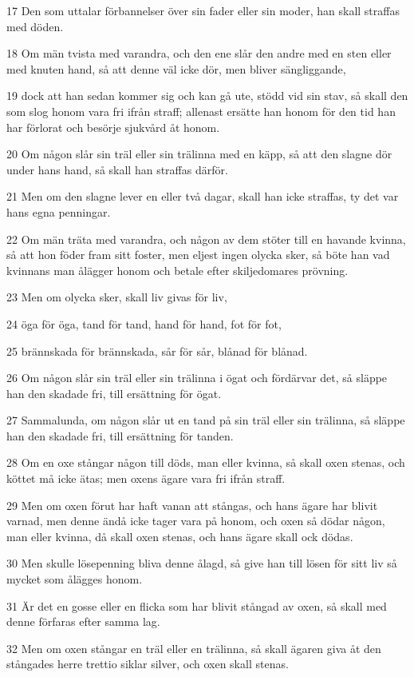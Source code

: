 \par 17 Den som uttalar förbannelser över sin fader eller sin moder, han skall straffas med döden.
\par 18 Om män tvista med varandra, och den ene slår den andre med en sten eller med knuten hand, så att denne väl icke dör, men bliver sängliggande,
\par 19 dock att han sedan kommer sig och kan gå ute, stödd vid sin stav, så skall den som slog honom vara fri ifrån straff; allenast ersätte han honom för den tid han har förlorat och besörje sjukvård åt honom.
\par 20 Om någon slår sin träl eller sin trälinna med en käpp, så att den slagne dör under hans hand, så skall han straffas därför.
\par 21 Men om den slagne lever en eller två dagar, skall han icke straffas, ty det var hans egna penningar.
\par 22 Om män träta med varandra, och någon av dem stöter till en havande kvinna, så att hon föder fram sitt foster, men eljest ingen olycka sker, så böte han vad kvinnans man ålägger honom och betale efter skiljedomares prövning.
\par 23 Men om olycka sker, skall liv givas för liv,
\par 24 öga för öga, tand för tand, hand för hand, fot för fot,
\par 25 brännskada för brännskada, sår för sår, blånad för blånad.
\par 26 Om någon slår sin träl eller sin trälinna i ögat och fördärvar det, så släppe han den skadade fri, till ersättning för ögat.
\par 27 Sammalunda, om någon slår ut en tand på sin träl eller sin trälinna, så släppe han den skadade fri, till ersättning för tanden.
\par 28 Om en oxe stångar någon till döds, man eller kvinna, så skall oxen stenas, och köttet må icke ätas; men oxens ägare vara fri ifrån straff.
\par 29 Men om oxen förut har haft vanan att stångas, och hans ägare har blivit varnad, men denne ändå icke tager vara på honom, och oxen så dödar någon, man eller kvinna, då skall oxen stenas, och hans ägare skall ock dödas.
\par 30 Men skulle lösepenning bliva denne ålagd, så give han till lösen för sitt liv så mycket som ålägges honom.
\par 31 Är det en gosse eller en flicka som har blivit stångad av oxen, så skall med denne förfaras efter samma lag.
\par 32 Men om oxen stångar en träl eller en trälinna, så skall ägaren giva åt den stångades herre trettio siklar silver, och oxen skall stenas.
